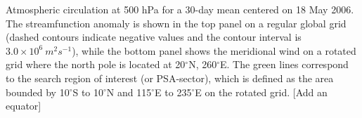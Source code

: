\label{fig:rotation}
Atmospheric circulation at 500 hPa for a 30-day mean centered on 18 May 2006. The streamfunction anomaly is shown in the top panel on a regular global grid (dashed contours indicate negative values and the contour interval is $3.0 \times 10^6 \: m^2 s^{-1}$), while the bottom panel shows the meridional wind on a rotated grid where the north pole is located at 20$^{\circ}$N, 260$^{\circ}$E. The green lines correspond to the search region of interest (or PSA-sector), which is defined as the area bounded by 10$^{\circ}$S to 10$^{\circ}$N and 115$^{\circ}$E to 235$^{\circ}$E on the rotated grid. [Add an equator]